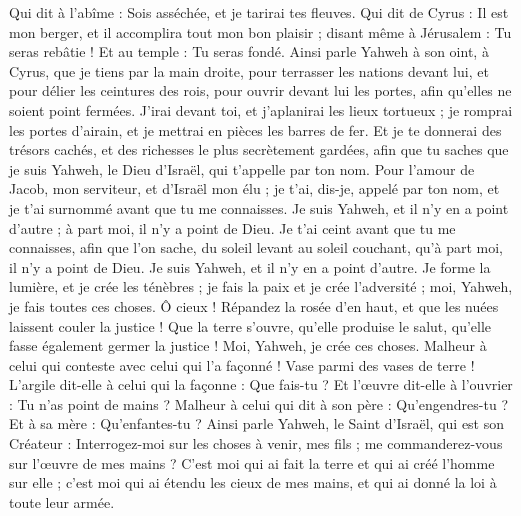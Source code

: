 \begin{multicols}{2}
Qui dit à l'abîme : Sois asséchée, et je tarirai tes fleuves.
Qui dit de Cyrus : Il est mon berger, et il accomplira tout mon bon plaisir ; disant même à Jérusalem : Tu seras rebâtie ! Et au temple : Tu seras fondé.
\VerseOne{}Ainsi parle Yahweh à son oint, à Cyrus,
que je tiens par la main droite, pour terrasser les nations devant lui, et pour délier les ceintures des rois, pour ouvrir devant lui les portes, afin qu'elles ne soient point fermées.
J'irai devant toi, et j'aplanirai les lieux tortueux ; je romprai les portes d'airain, et je mettrai en pièces les barres de fer. Et je te donnerai des trésors cachés, et des richesses le plus secrètement gardées, afin que tu saches que je suis Yahweh, le Dieu d'Israël, qui t'appelle par ton nom.
Pour l'amour de Jacob, mon serviteur, et d'Israël mon élu ; je t'ai, dis-je, appelé par ton nom, et je t'ai surnommé avant que tu me connaisses.
Je suis Yahweh, et il n'y en a point d'autre ; à part moi, il n'y a point de Dieu. Je t'ai ceint avant que tu me connaisses,
afin que l'on sache, du soleil levant au soleil couchant, qu'à part moi, il n'y a point de Dieu. Je suis Yahweh, et il n'y en a point d'autre.
Je forme la lumière, et je crée les ténèbres ; je fais la paix et je crée l'adversité ; moi, Yahweh, je fais toutes ces choses.
Ô cieux ! Répandez la rosée d'en haut, et que les nuées laissent couler la justice ! Que la terre s'ouvre, qu'elle produise le salut, qu'elle fasse également germer la justice ! Moi, Yahweh, je crée ces choses.
Malheur à celui qui conteste avec celui qui l'a façonné ! Vase parmi des vases de terre ! L'argile dit-elle à celui qui la façonne : Que fais-tu ? Et l'œuvre dit-elle à l'ouvrier : Tu n'as point de mains ?
Malheur à celui qui dit à son père : Qu'engendres-tu ? Et à sa mère : Qu'enfantes-tu ?
Ainsi parle Yahweh, le Saint d'Israël, qui est son Créateur : Interrogez-moi sur les choses à venir, mes fils ; me commanderez-vous sur l'œuvre de mes mains ?
C'est moi qui ai fait la terre et qui ai créé l'homme sur elle ; c'est moi qui ai étendu les cieux de mes mains, et qui ai donné la loi à toute leur armée.

\end{multicols}
